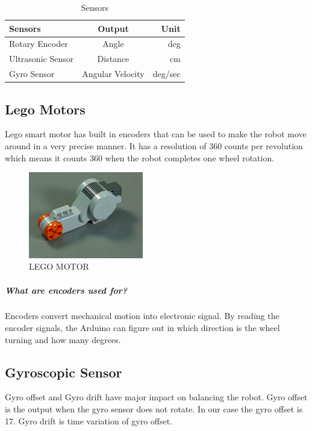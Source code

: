 \documentclass{article}
\begin{document}
 		\begin{table}[h]
 		\begin{center}
 			\caption{Sensors}
 			\label{tab:table1}
 			\begin{tabular}{l|c|r} %
 				\textbf{Sensors} & \textbf{Output} & \textbf{Unit}\\
 				\hline
 				Rotary Encoder & Angle & deg\\
 				Ultrasonic Sensor & Distance & cm\\
 				Gyro Sensor & Angular Velocity & deg/sec\\
 			\end{tabular}
 		\end{center}
 		
 	\end{table}
 	
 	
 	
 	\subsection{Lego Motors}
 	Lego smart motor has built in encoders that can be used to make the robot move around in a very precise manner. It has a resolution of 360 counts per revolution which means it counts 360 when the robot completes one wheel rotation.
 	 
 	\begin{figure}[h]
 		\centering
 		\includegraphics[width=50mm,scale=0.5]{legomotor}
 		\caption{LEGO MOTOR}
 		\label{Fig.2: LEGO MOTOR}
 	\end{figure} 
  
 
 	\subparagraph{What are encoders used for?}
 	Encoders convert mechanical motion into electronic signal. By reading the encoder signals, the Arduino can figure out in which direction is the wheel turning and how many degrees.
 	
 	\subsection{Gyroscopic Sensor}
 	Gyro offset and Gyro drift have major impact on balancing the robot.
 	Gyro offset is the output when the gyro sensor does not rotate. In our case the gyro offset is 17. Gyro drift is time variation of gyro offset.
 	
\end{document}
